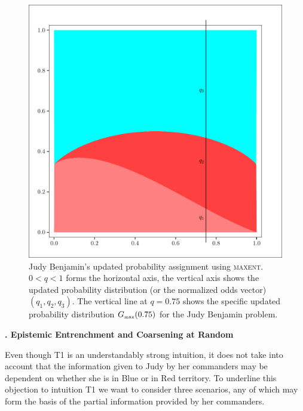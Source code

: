\documentclass[12pt]{article}
\newcommand{\kapt}[1]{\noindent \textbf{{\thechap}. #1}\addtocounter{chap}{1}}
\def\lwv{.6}
\newcommand{\nias}{\noindent} %
\begin{document}
\begin{figure}[h]
  \begin{flushright}
    \begin{minipage}[h]{\lwv\linewidth}
      \includegraphics[width=\textwidth]{zeroone-mxnt.pdf}
      \caption{Judy Benjamin's updated probability assignment using
        \textsc{maxent}. $0<q<1$ forms the horizontal axis, the
        vertical axis shows the updated probability distribution (or
        the normalized odds vector) $(q_{1},q_{2},q_{3})$. The
        vertical line at $q=0.75$ shows the specific updated
        probability distribution $G_{\mbox{\tiny max}}(0.75)$ for the Judy
        Benjamin problem.}
      \label{fig:mxnt}
    \end{minipage}
  \end{flushright}
\end{figure}

\medskip

\kapt{Epistemic Entrenchment and Coarsening at Random}

\nias Even though T1 is an understandably strong intuition, it does
not take into account that the information given to Judy by her
commanders may be dependent on whether she is in Blue or in Red
territory. To underline this objection to intuition T1 we want to
consider three scenarios, any of which may form the basis of the
partial information provided by her commanders.
\end{document}
